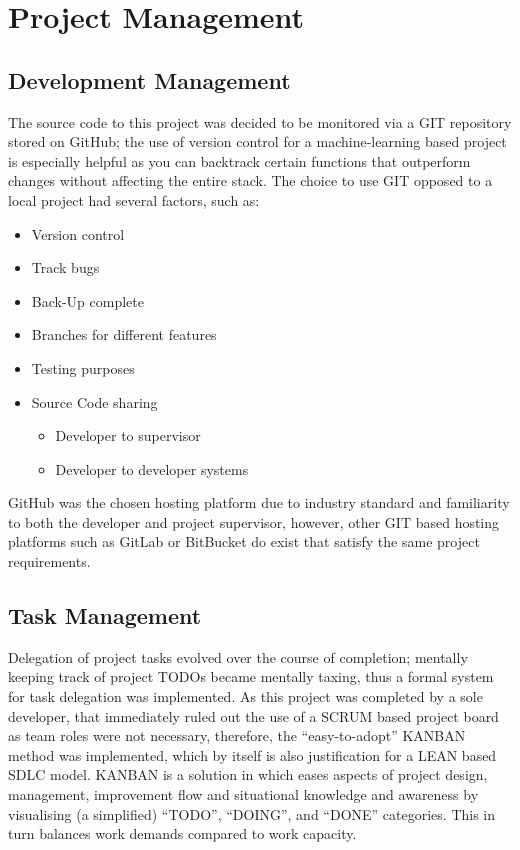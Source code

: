 \section{Project Management}

\subsection{Development Management}

The source code to this project was decided to be monitored via a GIT repository stored on GitHub; the use of version control for a machine-learning based project is especially helpful as you can backtrack certain functions that outperform changes without affecting the entire stack. The choice to use GIT opposed to a local project had several factors, such as:

\begin{itemize}
    \item Version control
    \item Track bugs
    \item Back-Up complete
    \item Branches for different features
    \item Testing purposes
    \item Source Code sharing
        \begin{itemize}
            \item Developer to supervisor
            \item Developer to developer systems
        \end{itemize}
\end{itemize}

GitHub was the chosen hosting platform due to industry standard and familiarity to both the developer and project supervisor, however, other GIT based hosting platforms such as GitLab or BitBucket do exist that satisfy the same project requirements.

\subsection{Task Management}

Delegation of project tasks evolved over the course of completion; mentally keeping track of project TODOs became mentally taxing, thus a formal system for task delegation was implemented. As this project was completed by a sole developer, that immediately ruled out the use of a SCRUM based project board as team roles were not necessary, therefore, the “easy-to-adopt” KANBAN method was implemented, which by itself is also justification for a LEAN based SDLC model. KANBAN is a solution in which eases aspects of project design, management, improvement flow and situational knowledge and awareness by visualising (a simplified) “TODO”, “DOING”, and “DONE” categories. This in turn balances work demands compared to work capacity.

